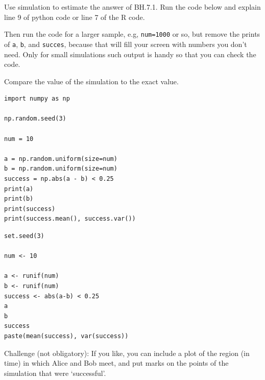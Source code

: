 \documentclass[../../assignments/assignments]{subfiles}
\begin{document}
\begin{exercise}
Use simulation to estimate the answer of BH.7.1. Run the code below and explain line 9 of python code or line 7 of the R code.


Then run the code for a larger sample, e.g, \verb|num=1000| or so, but remove the prints of \verb|a|, \verb|b|, and \verb|succes|, because that will fill your screen with numbers you don't need.
Only for small simulations such output is handy so that you can check the code.

Compare the value of the simulation to the exact value.


\begin{verbatim}
import numpy as np

np.random.seed(3)

num = 10

a = np.random.uniform(size=num)
b = np.random.uniform(size=num)
success = np.abs(a - b) < 0.25
print(a)
print(b)
print(success)
print(success.mean(), success.var())
\end{verbatim}


\begin{verbatim}
set.seed(3)

num <- 10

a <- runif(num)
b <- runif(num)
success <- abs(a-b) < 0.25
a
b
success
paste(mean(success), var(success))
\end{verbatim}

Challenge (not obligatory): If you like, you can include a plot of the region (in time) in which Alice and Bob meet, and put marks on the points of the simulation that were `successful'.


\end{exercise}
\end{document}
